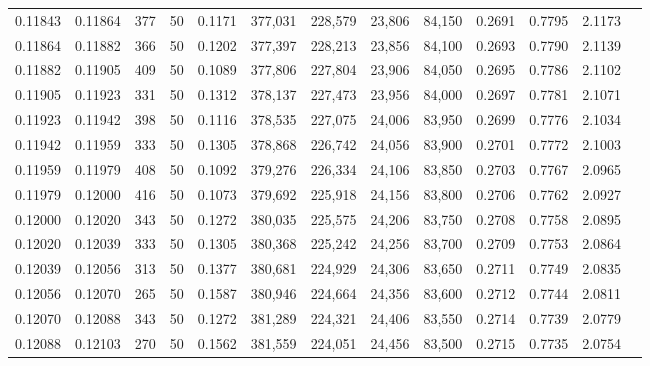 \begin{tabular}{rrrrrrrrrrrrr}
0.11843 & 0.11864 &   377 &  50 &                                     0.1171 & 377,031 & 228,579 &  23,806 &  84,150 & 0.2691 & 0.7795 & 2.1173 \\
0.11864 & 0.11882 &   366 &  50 &                                     0.1202 & 377,397 & 228,213 &  23,856 &  84,100 & 0.2693 & 0.7790 & 2.1139 \\
0.11882 & 0.11905 &   409 &  50 &                                     0.1089 & 377,806 & 227,804 &  23,906 &  84,050 & 0.2695 & 0.7786 & 2.1102 \\
0.11905 & 0.11923 &   331 &  50 &                                     0.1312 & 378,137 & 227,473 &  23,956 &  84,000 & 0.2697 & 0.7781 & 2.1071 \\
0.11923 & 0.11942 &   398 &  50 &                                     0.1116 & 378,535 & 227,075 &  24,006 &  83,950 & 0.2699 & 0.7776 & 2.1034 \\
0.11942 & 0.11959 &   333 &  50 &                                     0.1305 & 378,868 & 226,742 &  24,056 &  83,900 & 0.2701 & 0.7772 & 2.1003 \\
0.11959 & 0.11979 &   408 &  50 &                                     0.1092 & 379,276 & 226,334 &  24,106 &  83,850 & 0.2703 & 0.7767 & 2.0965 \\
0.11979 & 0.12000 &   416 &  50 &                                     0.1073 & 379,692 & 225,918 &  24,156 &  83,800 & 0.2706 & 0.7762 & 2.0927 \\
0.12000 & 0.12020 &   343 &  50 &                                     0.1272 & 380,035 & 225,575 &  24,206 &  83,750 & 0.2708 & 0.7758 & 2.0895 \\
0.12020 & 0.12039 &   333 &  50 &                                     0.1305 & 380,368 & 225,242 &  24,256 &  83,700 & 0.2709 & 0.7753 & 2.0864 \\
0.12039 & 0.12056 &   313 &  50 &                                     0.1377 & 380,681 & 224,929 &  24,306 &  83,650 & 0.2711 & 0.7749 & 2.0835 \\
0.12056 & 0.12070 &   265 &  50 &                                     0.1587 & 380,946 & 224,664 &  24,356 &  83,600 & 0.2712 & 0.7744 & 2.0811 \\
0.12070 & 0.12088 &   343 &  50 &                                     0.1272 & 381,289 & 224,321 &  24,406 &  83,550 & 0.2714 & 0.7739 & 2.0779 \\
0.12088 & 0.12103 &   270 &  50 &                                     0.1562 & 381,559 & 224,051 &  24,456 &  83,500 & 0.2715 & 0.7735 & 2.0754 \\

\end{tabular}
